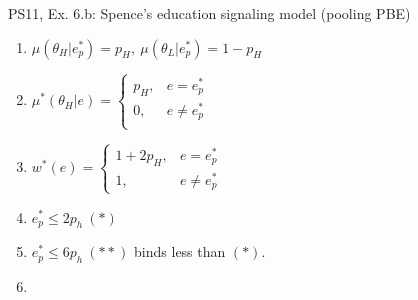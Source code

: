 \begin{frame}{PS11, Ex. 6.b: Spence’s education signaling model (pooling PBE)}
\begin{multicols}{2}
\begin{enumerate}
        \item $\mu\left(\theta_H|e_p^*\right)=p_H,\
               \mu\left(\theta_L|e_p^*\right)=1-p_H$
        \item $\mu^*(\theta_H|e)=\left\{\begin{array}{ll}
                  p_H, & e = e_p^* \\
                  0, & e \neq e_p^* \\
               \end{array}\right.$
        \item $w^*(e)=\left\{\begin{array}{ll}
                  1+2p_H, & e = e_p^* \\
                  1, & e \neq e_p^*
               \end{array}\right.$
        \item $e_p^*\leq2p_h\ (*)$
        \item $e_p^*\leq6p_h\ (**)$ binds less than $(*)$.
        \item[] {}
      \end{enumerate}
      \vfill\null
    \end{multicols}
\end{frame}
